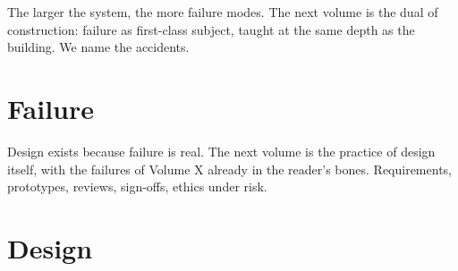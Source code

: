 \documentclass[11pt,a4paper,openright,twoside]{memoir}
\begin{document}
\begin{interlude}
The larger the system, the more failure modes.
The next volume is the dual of construction: failure as first-class subject, taught at the same depth as the building.
We name the accidents.
\end{interlude}

\part{Failure}
\label{vol10}




















\begin{interlude}
Design exists because failure is real.
The next volume is the practice of design itself, with the failures of Volume X already in the reader's bones.
Requirements, prototypes, reviews, sign-offs, ethics under risk.
\end{interlude}

\part{Design}
\label{vol11}
















\end{document}

